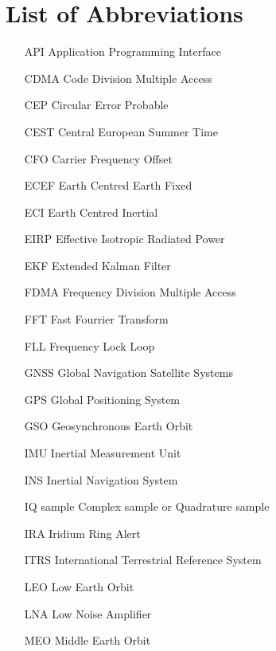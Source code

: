 \chapter{List of Abbreviations}


\begin{itemize}
\setlength\itemsep{0em}
\item[API      ] Application Programming Interface          
\item[CDMA     ] Code Division Multiple Access              
\item[CEP      ] Circular Error Probable                    
\item[CEST     ] Central European Summer Time               
\item[CFO      ] Carrier Frequency Offset                          
\item[ECEF     ] Earth Centred Earth Fixed                  
\item[ECI      ] Earth Centred Inertial                     
\item[EIRP     ] Effective Isotropic Radiated Power         
\item[EKF      ] Extended Kalman Filter                     
\item[FDMA     ] Frequency Division Multiple Access         
\item[FFT      ] Fast Fourrier Transform                    
\item[FLL      ] Frequency Lock Loop                        
\item[GNSS     ] Global Navigation Satellite Systems        
\item[GPS      ] Global Positioning System                  
\item[GSO      ] Geosynchronous Earth Orbit                 
\item[IMU      ] Inertial Measurement Unit                  
\item[INS      ] Inertial Navigation System                 
\item[IQ sample] Complex sample or Quadrature sample        
\item[IRA      ] Iridium Ring Alert                         
\item[ITRS     ] International Terrestrial Reference System 
\item[LEO      ] Low Earth Orbit                            
\item[LNA      ] Low Noise Amplifier                        
\item[MEO      ] Middle Earth Orbit                         

\end{itemize}

